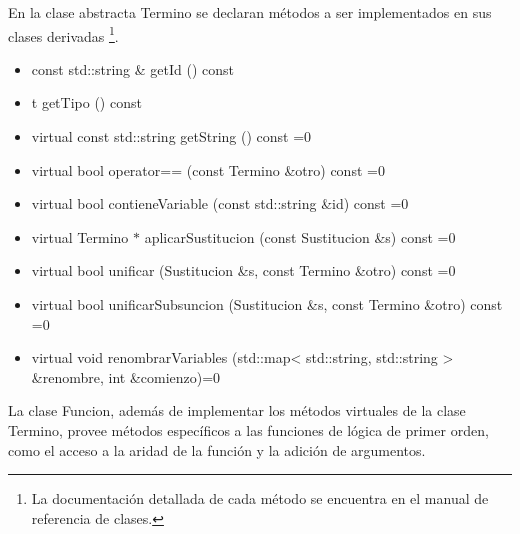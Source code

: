\documentclass[a4paper,12pt]{article}
\begin{document}
En la clase abstracta Termino se declaran métodos a ser implementados en sus clases derivadas
\footnote{La documentación detallada de cada método se encuentra en el manual de referencia de clases.}.
\begin{itemize}
\renewcommand{\labelitemi}{$\bullet$}
\item const std::string \& getId () const
\item t getTipo () const
\item virtual const std::string getString () const =0
\item virtual bool operator== (const Termino \&otro) const =0
\item virtual bool contieneVariable (const std::string \&id) const =0
\item virtual Termino $\ast$ aplicarSustitucion (const Sustitucion \&s) const =0
\item virtual bool unificar (Sustitucion \&s, const Termino \&otro) const =0
\item virtual bool unificarSubsuncion (Sustitucion \&s, const Termino \&otro) const =0
\item virtual void renombrarVariables (std::map< std::string, std::string > \&renombre, int \&comienzo)=0
\end{itemize}
La clase Funcion, además de implementar los métodos virtuales de la clase Termino,
provee métodos específicos a las funciones de lógica de primer orden, como el acceso a la aridad
de la función y la adición de argumentos.
\end{document}
